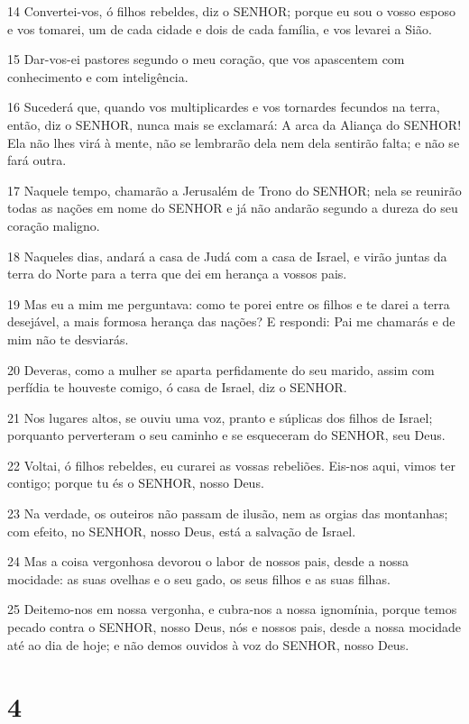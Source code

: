 \par 14 Convertei-vos, ó filhos rebeldes, diz o SENHOR; porque eu sou o vosso esposo e vos tomarei, um de cada cidade e dois de cada família, e vos levarei a Sião.
\par 15 Dar-vos-ei pastores segundo o meu coração, que vos apascentem com conhecimento e com inteligência.
\par 16 Sucederá que, quando vos multiplicardes e vos tornardes fecundos na terra, então, diz o SENHOR, nunca mais se exclamará: A arca da Aliança do SENHOR! Ela não lhes virá à mente, não se lembrarão dela nem dela sentirão falta; e não se fará outra.
\par 17 Naquele tempo, chamarão a Jerusalém de Trono do SENHOR; nela se reunirão todas as nações em nome do SENHOR e já não andarão segundo a dureza do seu coração maligno.
\par 18 Naqueles dias, andará a casa de Judá com a casa de Israel, e virão juntas da terra do Norte para a terra que dei em herança a vossos pais.
\par 19 Mas eu a mim me perguntava: como te porei entre os filhos e te darei a terra desejável, a mais formosa herança das nações? E respondi: Pai me chamarás e de mim não te desviarás.
\par 20 Deveras, como a mulher se aparta perfidamente do seu marido, assim com perfídia te houveste comigo, ó casa de Israel, diz o SENHOR.
\par 21 Nos lugares altos, se ouviu uma voz, pranto e súplicas dos filhos de Israel; porquanto perverteram o seu caminho e se esqueceram do SENHOR, seu Deus.
\par 22 Voltai, ó filhos rebeldes, eu curarei as vossas rebeliões. Eis-nos aqui, vimos ter contigo; porque tu és o SENHOR, nosso Deus.
\par 23 Na verdade, os outeiros não passam de ilusão, nem as orgias das montanhas; com efeito, no SENHOR, nosso Deus, está a salvação de Israel.
\par 24 Mas a coisa vergonhosa devorou o labor de nossos pais, desde a nossa mocidade: as suas ovelhas e o seu gado, os seus filhos e as suas filhas.
\par 25 Deitemo-nos em nossa vergonha, e cubra-nos a nossa ignomínia, porque temos pecado contra o SENHOR, nosso Deus, nós e nossos pais, desde a nossa mocidade até ao dia de hoje; e não demos ouvidos à voz do SENHOR, nosso Deus.

\chapter{4}

